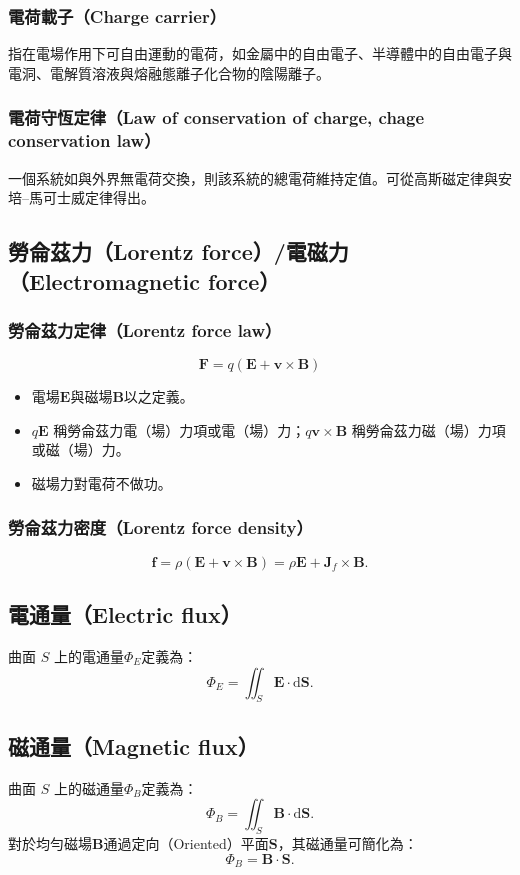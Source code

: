 \documentclass[a4paper,12pt]{report}
\begin{document}
\begin{itemize}
\subsubsection{電荷載子（Charge carrier）}
指在電場作用下可自由運動的電荷，如金屬中的自由電子、半導體中的自由電子與電洞、電解質溶液與熔融態離子化合物的陰陽離子。
\subsubsection{電荷守恆定律（Law of conservation of charge, chage conservation law）}
一個系統如與外界無電荷交換，則該系統的總電荷維持定值。可從高斯磁定律與安培–馬可士威定律得出。
\subsection{勞侖茲力（Lorentz force）/電磁力（Electromagnetic force）}
\subsubsection{勞侖茲力定律（Lorentz force law）}
\[\mathbf{F} = q (\mathbf{E} + \mathbf{v} \times \mathbf{B})\]
\begin{itemize}
\item 電場$\mathbf{E}$與磁場$\mathbf{B}$以之定義。
\item $q\mathbf{E}$ 稱勞侖茲力電（場）力項或電（場）力；$q\mathbf{v} \times \mathbf{B}$ 稱勞侖茲力磁（場）力項或磁（場）力。
\item 磁場力對電荷不做功。
\end{itemize}
\subsubsection{勞侖茲力密度（Lorentz force density）}
\[\mathbf{f} = \rho (\mathbf{E} + \mathbf{v} \times \mathbf{B}) = \rho \mathbf{E} + \mathbf{J}_f \times \mathbf{B}.\]
\subsection{電通量（Electric flux）}
曲面 $S$ 上的電通量$\Phi_{E}$定義為：
\[\Phi_{E}=\iint _{S}\mathbf {E} \cdot \mathrm{d}\mathbf{S}.\]
\subsection{磁通量（Magnetic flux）}
曲面 $S$ 上的磁通量$\Phi_{B}$定義為：
\[\Phi_{B}=\iint _{S}\mathbf {B} \cdot \mathrm{d}\mathbf{S}.\]
對於均勻磁場$\mathbf{B}$通過定向（Oriented）平面$\mathbf{S}$，其磁通量可簡化為：
\[\Phi_{B}=\mathbf{B}\cdot\mathbf{S}.\]

\end{itemize}
\end{document}
